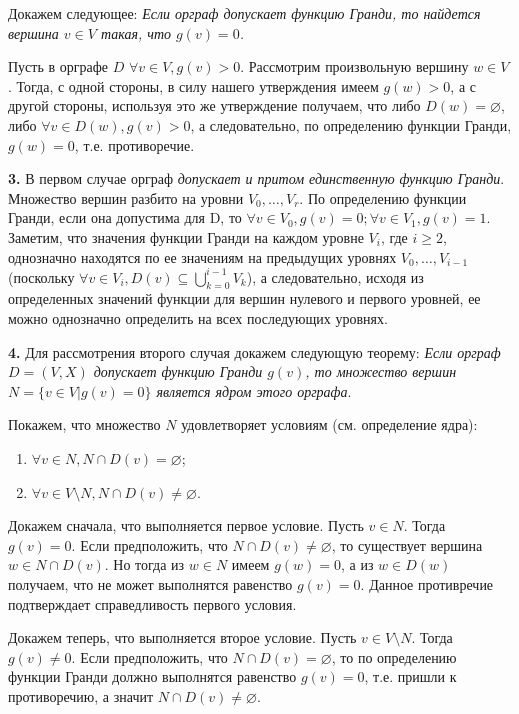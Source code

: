 \documentclass[12pt, letterpaper, titlepage]{article}
\let\emptyset\varnothing
\begin{document}
Докажем следующее: \emph{Если орграф допускает функцию Гранди, то найдется вершина $v \in V$ такая, что $g(v)=0$.}

Пусть в орграфе $D$ $\forall v \in V, g(v)>0$. Рассмотрим произвольную вершину $w \in V$. Тогда, с одной стороны, в силу нашего утверждения
имеем $g(w)>0$, а с другой стороны, используя это же утверждение получаем, что либо $D(w)=\emptyset$, либо $\forall v \in D(w),g(v)>0$, а следовательно,
по определению  функции Гранди, $g(w)=0$, т.е. противоречие.

\textbf{3. }В первом случае орграф \emph{допускает и притом единственную функцию Гранди}. Множество вершин разбито на уровни $V_0, \dots, V_r$.
По определению функции Гранди, если она допустима для D, то $\forall v \in V_0, g(v)=0; \forall v \in V_1, g(v)=1$.
Заметим, что значения функции Гранди на каждом уровне $V_i$, где $i \geq 2$, однозначно находятся по ее значениям на предыдущих
уровнях $V_0, \dots, V_{i-1}$ (поскольку $\forall v \in V_i, D(v) \subseteq \bigcup_{k=0}^{i-1} V_k$), а следовательно, исходя из определенных
значений функции для вершин нулевого и первого уровней, ее можно однозначно определить на всех последующих уровнях.

\textbf{4. }Для рассмотрения второго случая докажем следующую теорему: \emph{Если орграф $D=(V,X)$ допускает функцию Гранди $g(v)$, то множество вершин
$N=\{v \in V | g(v) =0\}$ является ядром этого орграфа}.

Покажем, что множество $N$ удовлетворяет условиям (см. определение ядра):

\begin{enumerate}
    \item $\forall v \in N, N\cap D(v)=\emptyset$;
    \item $\forall v \in V \setminus N, N \cap D(v) \neq \emptyset$.
\end{enumerate}

Докажем сначала, что выполняется первое условие. Пусть $v \in N$. Тогда $g(v)=0$.
Если предположить, что $N \cap D(v) \neq \emptyset$, то существует вершина $w \in N \cap D(v)$.
Но тогда из $w \in N$ имеем $g(w) = 0$, а из $w \in D(w)$ получаем, что не может выполнятся равенство
$g(v)=0$. Данное противречие подтверждает справедливость первого условия.

Докажем теперь, что выполняется второе условие. Пусть $v \in V \setminus N$. Тогда
$g(v) \neq 0$. Если предположить, что $N \cap D(v) = \emptyset$, то по определению
функции Гранди должно выполнятся равенство $g(v)=0$, т.е. пришли к противоречию, а значит
$N \cap D(v) \neq \emptyset$.
\end{document}
